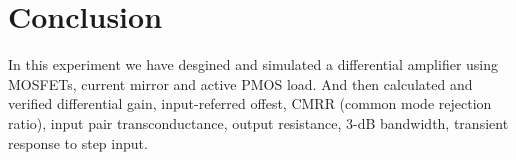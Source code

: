 \documentclass[12pt,a4paper]{article}
\begin{document}
\section{Conclusion}
In this experiment we have desgined and simulated a differential amplifier using MOSFETs, current mirror and active PMOS load. And then calculated and verified differential gain, input-referred offest, CMRR (common mode rejection ratio), input pair transconductance, output resistance, 3-dB bandwidth, transient response to step input.
\end{document}
